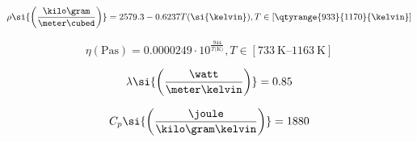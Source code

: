 \begin{equation}
  \rho\si{\left(\frac{\kilo\gram}{\meter\cubed}\right)} = 2579.3 - 0.6237T
  (\si{\kelvin}),T\in[\qtyrange{933}{1170}{\kelvin}]
  \label{eq: flinak density}
\end{equation}

\begin{equation}
  \eta(\si{\pascal\second}) = 0.0000249\cdot10^\frac{944}{T\si{(\kelvin)}},T
  \in [\qtyrange{733}{1163}{\kelvin}]
  \label{eq: flinak viscosity}
\end{equation}

\begin{equation}
  \lambda\si{\left(\frac{\watt}{\meter\kelvin}\right)} = 0.85
  \label{eq: flinak conductivity}
\end{equation}

\begin{equation}
  C_p\si{\left(\frac{\joule}{\kilo\gram\kelvin}\right)} = 1880
  \label{eq: flinak heat capacity}
\end{equation}
